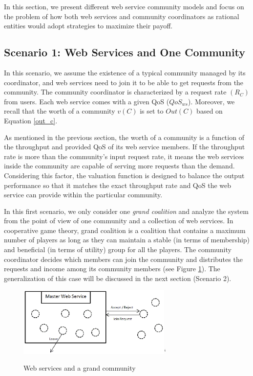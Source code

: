 \documentclass[10pt,journal,cspaper,compsoc]{IEEEtran}
\begin{document}
In this section, we present different web service community models
and focus on the problem of how both web services and community
coordinators as rational entities would adopt strategies to maximize
their payoff.

\subsection {Scenario 1: Web Services and One Community}

In this scenario, we assume the existence of a typical community
managed by its coordinator, and web services need to join it to be
able to get requests from the community. The community coordinator
is characterized by a request rate $(R_{C})$ from users. Each web
service comes with a given QoS ($QoS_{ws}$). Moreover, we recall
that the worth of a community $v(C)$ is set to $Out(C)$ based on
Equation \ref{out_c}.

As mentioned in the previous section, the worth of a community is
a function of the throughput and provided QoS of its web service
members. If the throughput rate is more than the community's input
request rate, it means the web services inside the community are
capable of serving more requests than the demand. Considering this
factor, the valuation function is designed to balance the output
performance so that it matches the exact throughput rate and QoS
the web service can provide within the particular community.

In this first scenario, we only consider one \emph{grand
coalition} and analyze the system from the point of view of one
community and a collection of web services. In cooperative game
theory, grand coalition is a coalition that contains a maximum
number of players as long as they can maintain a stable (in terms
of membership) and beneficial (in terms of utility) group for all
the players. The community coordinator decides which members can
join
the community and distributes the requests and income among its
community members (see Figure \ref{fig_sim1}). The generalization
of this case will be discussed in the next section (Scenario 2).

\begin{figure}%
\centering
\includegraphics[width=3in]{s1.eps}`
\caption{Web services and a grand community} \label{fig_sim1}
\end{figure}
\end{document}
